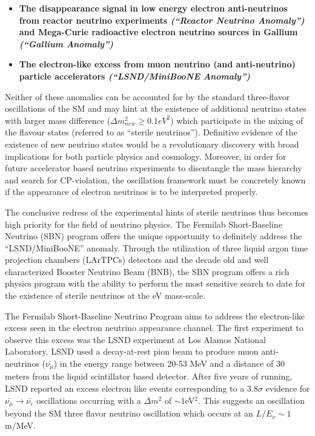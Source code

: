 \begin{itemize}
\item \textbf{The disappearance signal in low energy electron anti-neutrinos from reactor neutrino experiments \cite{No13} \textit{(``Reactor Neutrino Anomaly'')} and Mega-Curie radioactive electron neutrino sources in Gallium \cite{No14, No15} \textit{(``Gallium Anomaly'')}}

\item \textbf{The electron-like excess from muon neutrino (and anti-neutrino) particle accelerators \textit{(``LSND/MiniBooNE Anomaly'')} \cite{No16, No17}}

\end{itemize}

Neither of these anomalies can be accounted for by the standard three-flavor oscillations of the SM and may hint at the existence of additional neutrino states with larger mass difference ($\Delta m_{new}^{2}\geq 0.1 eV^{2}$) which participate in the mixing of the flavour states (referred to as ``sterile neutrinos''). Definitive evidence of the existence of new neutrino states would be a revolutionary discovery with broad implications for both particle physics and cosmology. Moreover, in order for future accelerator based neutrino experiments to disentangle the mass hierarchy and search for CP-violation, the oscillation framework must be concretely known if the appearance of electron neutrinos is to be interpreted properly. 

The conclusive redress of the experimental hints of sterile neutrinos thus becomes high priority for the field of neutrino physics. The Fermilab Short-Baseline Neutrino (SBN) program offers the unique opportunity to definitely address the ``LSND/MiniBooNE'' anomaly. Through the utilization of three liquid argon time projection chambers (LArTPCs) detectors and the decade old and well characterized Booster Neutrino Beam (BNB), the SBN program offers a rich physics program with the ability to perform the most sensitive search to date for the existence of sterile neutrinos at the eV mass-scale.


The Fermilab Short-Baseline Neutrino Program aims to address the electron-like excess seen in the electron neutrino appearance channel. The first experiment to observe this excess was the LSND experiment \cite{No16} at Los Alamos National Laboratory. LSND used a decay-at-rest pion beam to produce muon anti-neutrinos ($\bar{\nu_{\mu}}$) in the energy range between 20-53 MeV and a distance of 30 meters from the liquid scintillator based detector. After five years of running, LSND reported an excess electron like events corresponding to a 3.8$\sigma$ evidence for $\bar{\nu_{\mu}} \rightarrow \bar{\nu_{e}}$ oscillations occurring with a $\Delta m^{2}$ of $\sim 1$eV$^{2}$. This suggests an oscillation beyond the SM three flavor neutrino oscillation which occurs at an $L/E_{\nu} \sim 1$m/MeV.

